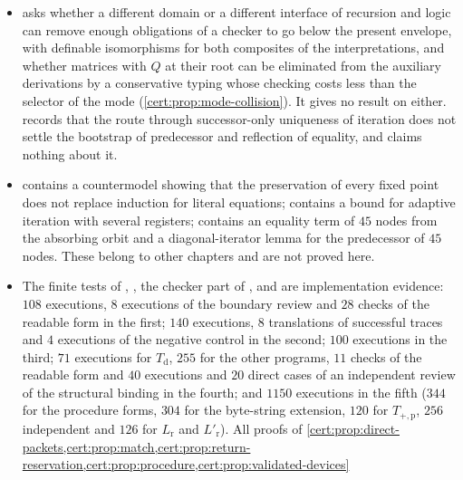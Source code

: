 \begin{itemize}
envelope. The censuses of  ($3204$ source entries of the
artifacts, $1922$ distinct blobs, $1667$ distinct normalized modules with the
incoming archives) and of  ($4716$ source occurrences, $1705$ distinct
normalized modules) are censuses of finite corpora, not lower bounds.
\item {} asks whether a different domain or a different
interface of recursion and logic can remove enough obligations of a checker to
go below the present envelope, with definable isomorphisms for both composites of
the interpretations, and whether matrices with $Q$ at their root can be
eliminated from the auxiliary derivations by a conservative typing whose checking
costs less than the selector of the mode (\cref{cert:prop:mode-collision}). It
gives no result on either.  records that the route
through successor-only uniqueness of iteration does not settle the bootstrap of
predecessor and reflection of equality, and claims nothing about it.
\item {} contains a countermodel showing that the
preservation of every fixed point does not replace induction for literal
equations;  contains a bound for adaptive iteration with
several registers;  contains an equality term of $45$ nodes
from the absorbing orbit and a diagonal-iterator lemma for the predecessor of
$45$ nodes. These belong to other chapters and are not proved here.
\item The finite tests of , ,
the checker part of ,  and
 are implementation evidence: $108$ executions,
$8$ executions of the boundary review and $28$ checks of the readable form in the
first; $140$ executions, $8$ translations of successful traces and $4$ executions
of the negative control in the second; $100$ executions in the third; $71$
executions for $T_{\mathrm d}$, $255$ for the other programs, $11$ checks of the
readable form and $40$ executions and $20$ direct cases of an independent review
of the structural binding in the fourth; and $1150$ executions in the fifth
($344$ for the procedure forms, $304$ for the byte-string extension, $120$ for
$T_{+,\mathrm p}$, $256$ independent and $126$ for $L_{\mathrm r}$ and
$L'_{\mathrm r}$). All proofs of
\cref{cert:prop:direct-packets,cert:prop:match,cert:prop:return-reservation,cert:prop:procedure,cert:prop:validated-devices}

\end{itemize}
